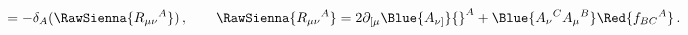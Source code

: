 \begin{equation}
  [\RawSienna{D_\mu},\RawSienna{D_\nu}]=-\delta _A(\RawSienna{R_{\mu \nu
  }{}^A})\,,\qquad
\RawSienna{R_{\mu\nu}{}^A} =
 2\partial_{[\mu}\Blue{A_{\nu]}}{}^A+ \Blue{A_\nu{}^C A_\mu{}^B}
 \Red{f_{BC}{}^A}\,.
 \label{curvatures}
\end{equation}

